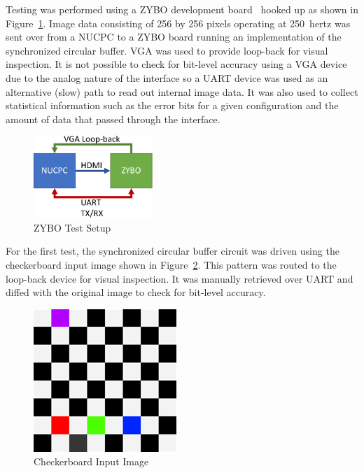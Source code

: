         Testing was performed using a ZYBO development board~\cite{Digilent2016} hooked up as shown in Figure~\ref{fig:zybo_setup}. Image data consisting of 256 by 256 pixels operating at \mbox{250 hertz} was sent over from a NUCPC to a ZYBO board running an implementation of the synchronized circular buffer. VGA was used to provide loop-back for visual inspection. It is not possible to check for bit-level accuracy using a VGA device due to the analog nature of the interface so a UART device was used as an alternative (slow) path to read out internal image data. It was also used to collect statistical information such as the error bits for a given configuration and the amount of data that passed through the interface.

        \begin{figure}[t]
            \centering
            \includegraphics[width=0.40\textwidth]{fig/zybo_setup.pdf}
            \caption{ZYBO Test Setup}
            \label{fig:zybo_setup}
        \end{figure}

        For the first test, the synchronized circular buffer circuit was driven using the checkerboard input image shown in Figure~\ref{fig:checker_pattern}. This pattern was routed to the loop-back device for visual inspection. It was manually retrieved over UART and diffed with the original image to check for bit-level accuracy.

        \begin{figure}[t]
            \centering
            \includegraphics{fig/checker.png}
            \caption{Checkerboard Input Image}
            \label{fig:checker_pattern}
        \end{figure}

